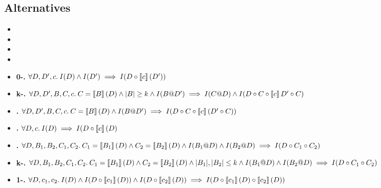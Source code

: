 \subsection{\iconfluence{} Alternatives}
\begin{itemize}
  \item {}
  \item {}
  \item {}
  \item {}
\end{itemize}

\begin{itemize}
  \item \textbf{0-\isafety.}
    $\forall D, D', c.\>
      I(D) \land
      I(D') \implies
      I(D \circ \left\llbracket c\right\rrbracket(D'))$

  \item \textbf{k-\isafety.}
    $\forall D, D', B, C, c.\>
       C = \left\llbracket B\right\rrbracket(D) \land
       |B| \geq k \land
       I(B @ D') \implies
       I(C @ D) \land
       I(D \circ C \circ \left\llbracket c\right\rrbracket{D' \circ C})$

  \item \textbf{\isafety.}
    $\forall D, D', B, C, c.\>
       C = \left\llbracket B\right\rrbracket(D) \land
       I(B @ D') \implies
       I(D \circ C \circ \left\llbracket c\right\rrbracket(D' \circ C))$

  \item \textbf{\ipreservation.} $\forall D, c.\>
       I(D) \implies
       I(D \circ \left\llbracket c\right\rrbracket(D)$

  \item \textbf{\iconfluence.}
    $\forall D, B_1, B_2, C_1, C_2. \>
       C_1 = \left\llbracket B_1\right\rrbracket(D) \land
       C_2 = \left\llbracket B_2\right\rrbracket(D) \land
       I(B_1 @ D) \land
       I(B_2 @ D) \implies
       I(D \circ C_1 \circ C_2)$

  \item \textbf{k-\iconfluence.}
    $\forall D, B_1, B_2, C_1, C_2. \>
       C_1 = \left\llbracket B_1\right\rrbracket(D) \land
       C_2 = \left\llbracket B_2\right\rrbracket(D) \land
       |B_1|, |B_2| \leq k \land
       I(B_1 @ D) \land
       I(B_2 @ D) \implies
       I(D \circ C_1 \circ C_2)$

  \item \textbf{1-\iconfluence.}
    $\forall D, c_1, c_2.\>
       I(D) \land
       I(D \circ \left\llbracket c_1\right\rrbracket(D)) \land
       I(D \circ \left\llbracket c_2\right\rrbracket(D)) \implies
       I(D \circ \left\llbracket c_1\right\rrbracket(D) \circ \left\llbracket c_2\right\rrbracket(D))$


\end{itemize}
